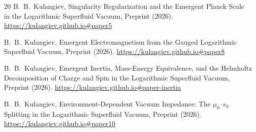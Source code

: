 \documentclass[12pt, a4paper]{article}
\begin{document}
\begin{thebibliography}{20}
B.~B.~Kulangiev,
Singularity Regularization and the Emergent Planck Scale in the Logarithmic Superfluid Vacuum,
Preprint (2026).
\url{https://kulangiev.github.io#paper5}

B.~B.~Kulangiev,
Emergent Electromagnetism from the Gauged Logarithmic Superfluid Vacuum,
Preprint (2026).
\url{https://kulangiev.github.io#paper8}

B.~B.~Kulangiev,
Emergent Inertia, Mass-Energy Equivalence, and the Helmholtz Decomposition of Charge and Spin in the Logarithmic Superfluid Vacuum,
Preprint (2026).
\url{https://kulangiev.github.io#paper-inertia}

B.~B.~Kulangiev,
Environment-Dependent Vacuum Impedance: The
$\mu_0$--$\epsilon_0$ Splitting in the Logarithmic Superfluid Vacuum,
Preprint (2026).
\url{https://kulangiev.github.io#paper10}

\end{thebibliography}
\end{document}
